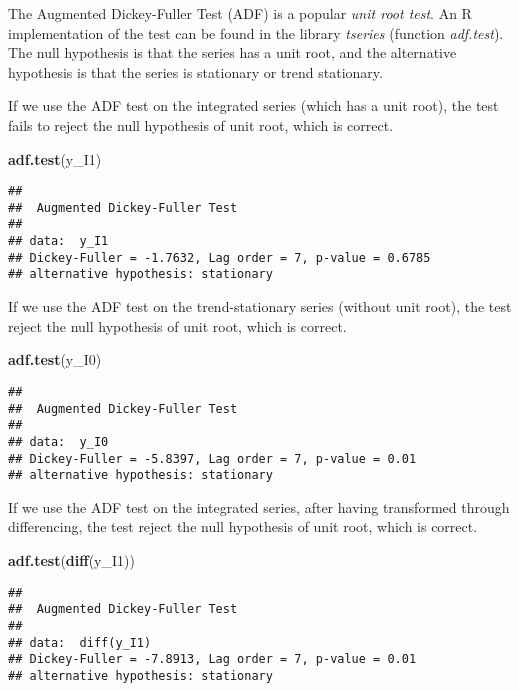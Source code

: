 \documentclass[
]{article}
\newenvironment{Shaded}{\begin{snugshade}}{\end{snugshade}}
\newcommand{\FunctionTok}[1]{\textcolor[rgb]{0.13,0.29,0.53}{\textbf{#1}}}
\newcommand{\NormalTok}[1]{#1}
\begin{document}
The Augmented Dickey-Fuller Test (ADF) is a popular \emph{unit root test}. An R implementation of the test can be found in the library \emph{tseries} (function \emph{adf.test}). The null hypothesis is that the series has a unit root, and the alternative hypothesis is that the series is stationary or trend stationary.

If we use the ADF test on the integrated series (which has a unit root), the test fails to reject the null hypothesis of unit root, which is correct.

\begin{Shaded}
\begin{Highlighting}[]
\FunctionTok{adf.test}\NormalTok{(y\_I1)}
\end{Highlighting}
\end{Shaded}

\begin{verbatim}
## 
##  Augmented Dickey-Fuller Test
## 
## data:  y_I1
## Dickey-Fuller = -1.7632, Lag order = 7, p-value = 0.6785
## alternative hypothesis: stationary
\end{verbatim}

If we use the ADF test on the trend-stationary series (without unit root), the test reject the null hypothesis of unit root, which is correct.

\begin{Shaded}
\begin{Highlighting}[]
\FunctionTok{adf.test}\NormalTok{(y\_I0)}
\end{Highlighting}
\end{Shaded}

\begin{verbatim}
## 
##  Augmented Dickey-Fuller Test
## 
## data:  y_I0
## Dickey-Fuller = -5.8397, Lag order = 7, p-value = 0.01
## alternative hypothesis: stationary
\end{verbatim}

If we use the ADF test on the integrated series, after having transformed through differencing, the test reject the null hypothesis of unit root, which is correct.

\begin{Shaded}
\begin{Highlighting}[]
\FunctionTok{adf.test}\NormalTok{(}\FunctionTok{diff}\NormalTok{(y\_I1))}
\end{Highlighting}
\end{Shaded}

\begin{verbatim}
## 
##  Augmented Dickey-Fuller Test
## 
## data:  diff(y_I1)
## Dickey-Fuller = -7.8913, Lag order = 7, p-value = 0.01
## alternative hypothesis: stationary
\end{verbatim}
\end{document}
